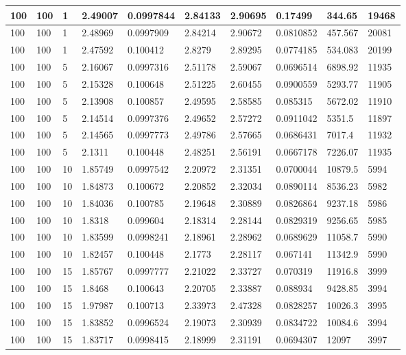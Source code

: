 \begin{landscape}
\begin{longtable}{ | l | l | l | l | l | l | l | l | l | l | }
100 & 100 & 1 & 2.49007 & 0.0997844 & 2.84133 & 2.90695 & 0.17499 & 344.65 & 19468\\ \hline
100 & 100 & 1 & 2.48969 & 0.0997909 & 2.84214 & 2.90672 & 0.0810852 & 457.567 & 20081\\ \hline
100 & 100 & 1 & 2.47592 & 0.100412 & 2.8279 & 2.89295 & 0.0774185 & 534.083 & 20199\\ \hline
100 & 100 & 5 & 2.16067 & 0.0997316 & 2.51178 & 2.59067 & 0.0696514 & 6898.92 & 11935\\ \hline
100 & 100 & 5 & 2.15328 & 0.100648 & 2.51225 & 2.60455 & 0.0900559 & 5293.77 & 11905\\ \hline
100 & 100 & 5 & 2.13908 & 0.100857 & 2.49595 & 2.58585 & 0.085315 & 5672.02 & 11910\\ \hline
100 & 100 & 5 & 2.14514 & 0.0997376 & 2.49652 & 2.57272 & 0.0911042 & 5351.5 & 11897\\ \hline
100 & 100 & 5 & 2.14565 & 0.0997773 & 2.49786 & 2.57665 & 0.0686431 & 7017.4 & 11932\\ \hline
100 & 100 & 5 & 2.1311 & 0.100448 & 2.48251 & 2.56191 & 0.0667178 & 7226.07 & 11935\\ \hline
100 & 100 & 10 & 1.85749 & 0.0997542 & 2.20972 & 2.31351 & 0.0700044 & 10879.5 & 5994\\ \hline
100 & 100 & 10 & 1.84873 & 0.100672 & 2.20852 & 2.32034 & 0.0890114 & 8536.23 & 5982\\ \hline
100 & 100 & 10 & 1.84036 & 0.100785 & 2.19648 & 2.30889 & 0.0826864 & 9237.18 & 5986\\ \hline
100 & 100 & 10 & 1.8318 & 0.099604 & 2.18314 & 2.28144 & 0.0829319 & 9256.65 & 5985\\ \hline
100 & 100 & 10 & 1.83599 & 0.0998241 & 2.18961 & 2.28962 & 0.0689629 & 11058.7 & 5990\\ \hline
100 & 100 & 10 & 1.82457 & 0.100448 & 2.1773 & 2.28117 & 0.067141 & 11342.9 & 5990\\ \hline
100 & 100 & 15 & 1.85767 & 0.0997777 & 2.21022 & 2.33727 & 0.070319 & 11916.8 & 3999\\ \hline
100 & 100 & 15 & 1.8468 & 0.100643 & 2.20705 & 2.33887 & 0.088934 & 9428.85 & 3994\\ \hline
100 & 100 & 15 & 1.97987 & 0.100713 & 2.33973 & 2.47328 & 0.0828257 & 10026.3 & 3995\\ \hline
100 & 100 & 15 & 1.83852 & 0.0996524 & 2.19073 & 2.30939 & 0.0834722 & 10084.6 & 3994\\ \hline
100 & 100 & 15 & 1.83717 & 0.0998415 & 2.18999 & 2.31191 & 0.0694307 & 12097 & 3997\\ \hline

\end{longtable}
\end{landscape}

